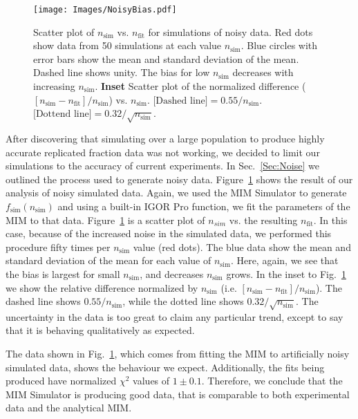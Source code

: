 		\begin{figure}[tbh]
			\begin{center}
				\texttt{[image: Images/NoisyBias.pdf]}
			\end{center}
				\caption[Bias in MIM fit on Noisy Data]{\label{fig:NoisyBias} Scatter plot of $n_\text{sim}$ vs. $n_\text{fit}$ for simulations of noisy data.
				Red dots show data from 50 simulations at each value $n_\text{sim}$.
				Blue circles with error bars show the mean and standard deviation of the mean.
				Dashed line shows unity.
				The bias for low $n_\text{sim}$ decreases with increasing $n_\text{sim}$.
				\textbf{Inset} Scatter plot of the normalized difference ($[n_\text{sim} - n_\text{fit}]/n_\text{sim}$) vs. $n_\text{sim}$.
				$\text{[Dashed line]} = 0.55/n_\text{sim}$.
				$\text{[Dottend line]} = 0.32/\sqrt{n_\text{sim}}$.
				}
		\end{figure}
		
		After discovering that simulating over a large population to produce highly accurate replicated fraction data was not working, we decided to limit our simulations to the accuracy of current experiments.
		In Sec.~\ref{Sec:Noise} we outlined the process used to generate noisy data.
		Figure~\ref{fig:NoisyBias} shows the result of our analysis of noisy simulated data.
		Again, we used the MIM Simulator to generate $f_\text{sim}(n_\text{sim})$ and using a built-in IGOR Pro function, we fit the parameters of the MIM to that data.
		Figure~\ref{fig:NoisyBias} is a scatter plot of $n_{sim}$ vs. the resulting $n_\text{fit}$.
		In this case, because of the increased noise in the simulated data, we performed this procedure fifty times per $n_\text{sim}$ value (red dots).
		The blue data show the mean and standard deviation of the mean for each value of $n_\text{sim}$.
		Here, again, we see that the bias is largest for small $n_\text{sim}$, and decreases $n_\text{sim}$ grows.
		In the inset to Fig.~\ref{fig:NoisyBias} we show the relative difference normalized by $n_\text{sim}$ (i.e. $[n_\text{sim} - n_\text{fit}]/n_\text{sim}$).
		The dashed line shows $0.55/n_\text{sim}$, while the dotted line shows $0.32/\sqrt{n_\text{sim}}$.
		The uncertainty in the data is too great to claim any particular trend, except to say that it is behaving qualitatively as expected.
		
		The data shown in Fig.~\ref{fig:NoisyBias}, which comes from fitting the MIM to artificially noisy simulated data, shows the behaviour we expect.
		Additionally, the fits being produced have normalized $\chi^2$ values of $1\pm 0.1$.
		Therefore, we conclude that the MIM Simulator is producing good data, that is comparable to both experimental data and the analytical MIM.
		
